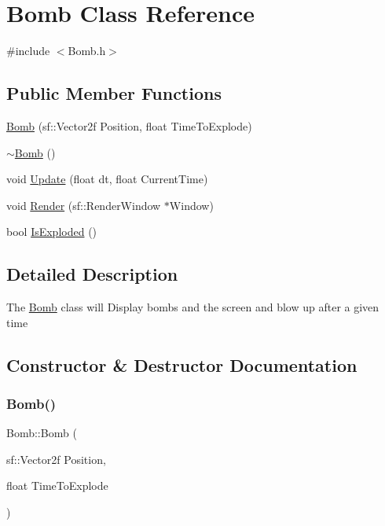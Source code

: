 \hypertarget{class_bomb}{}\section{Bomb Class Reference}
\label{class_bomb}


{\ttfamily \#include $<$Bomb.\+h$>$}

\subsection*{Public Member Functions}
\begin{DoxyCompactItemize}
\item 
\hyperlink{class_bomb_a70f8313ed21a19605a1ee6f65b6eaf18}{Bomb} (sf\+::\+Vector2f Position, float Time\+To\+Explode)
\item 
\hyperlink{class_bomb_acbb47327cfb2fa429887774ef3597965}{$\sim$\+Bomb} ()
\item 
void \hyperlink{class_bomb_a824b48a1cabce718db5b9b0c84452a35}{Update} (float dt, float Current\+Time)
\item 
void \hyperlink{class_bomb_af676fc06d6ede72f26fe4d7602e41ffa}{Render} (sf\+::\+Render\+Window $\ast$Window)
\item 
bool \hyperlink{class_bomb_a787ba65ab16bdcb5ff622ff2395e743f}{Is\+Exploded} ()
\end{DoxyCompactItemize}


\subsection{Detailed Description}
The \hyperlink{class_bomb}{Bomb} class will Display bombs and the screen and blow up after a given time 

\subsection{Constructor \& Destructor Documentation}
\hypertarget{class_bomb_a70f8313ed21a19605a1ee6f65b6eaf18}{}\label{class_bomb_a70f8313ed21a19605a1ee6f65b6eaf18} 
\subsubsection{\texorpdfstring{Bomb()}{Bomb()}}
{\footnotesize\ttfamily Bomb\+::\+Bomb (\begin{DoxyParamCaption}\item[{sf\+::\+Vector2f}]{Position,  }\item[{float}]{Time\+To\+Explode }\end{DoxyParamCaption})}

